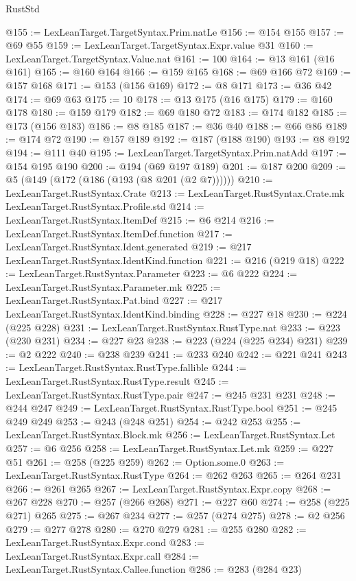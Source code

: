 \begin{lexlean}{RustStd}
\begin{coremodule}
{\begin{coremodule}
{{{{{{{{{@155 := LexLeanTarget.TargetSyntax.Prim.natLe
@156 := @154 @155
@157 := @69 @55
@159 := LexLeanTarget.TargetSyntax.Expr.value @31
@160 := LexLeanTarget.TargetSyntax.Value.nat
@161 := 100
@164 := @13 @161 (@16 @161)
@165 := @160 @164
@166 := @159 @165
@168 := @69 @166 @72
@169 := @157 @168
@171 := @153 (@156 @169)
@172 := @8 @171
@173 := @36 @42
@174 := @69 @63
@175 := 10
@178 := @13 @175 (@16 @175)
@179 := @160 @178
@180 := @159 @179
@182 := @69 @180 @72
@183 := @174 @182
@185 := @173 (@156 @183)
@186 := @8 @185
@187 := @36 @40
@188 := @66 @86
@189 := @174 @72
@190 := @157 @189
@192 := @187 (@188 @190)
@193 := @8 @192
@194 := @111 @40
@195 := LexLeanTarget.TargetSyntax.Prim.natAdd
@197 := @154 @195 @190
@200 := @194 (@69 @197 @189)
@201 := @187 @200
@209 := @5 (@149 (@172 (@186 (@193 (@8 @201 (@2 @7))))))
@210 := LexLeanTarget.RustSyntax.Crate
@213 := LexLeanTarget.RustSyntax.Crate.mk LexLeanTarget.RustSyntax.Profile.std
@214 := LexLeanTarget.RustSyntax.ItemDef
@215 := @6 @214
@216 := LexLeanTarget.RustSyntax.ItemDef.function
@217 := LexLeanTarget.RustSyntax.Ident.generated
@219 := @217 LexLeanTarget.RustSyntax.IdentKind.function
@221 := @216 (@219 @18)
@222 := LexLeanTarget.RustSyntax.Parameter
@223 := @6 @222
@224 := LexLeanTarget.RustSyntax.Parameter.mk
@225 := LexLeanTarget.RustSyntax.Pat.bind
@227 := @217 LexLeanTarget.RustSyntax.IdentKind.binding
@228 := @227 @18
@230 := @224 (@225 @228)
@231 := LexLeanTarget.RustSyntax.RustType.nat
@233 := @223 (@230 @231)
@234 := @227 @23
@238 := @223 (@224 (@225 @234) @231)
@239 := @2 @222
@240 := @238 @239
@241 := @233 @240
@242 := @221 @241
@243 := LexLeanTarget.RustSyntax.RustType.fallible
@244 := LexLeanTarget.RustSyntax.RustType.result
@245 := LexLeanTarget.RustSyntax.RustType.pair
@247 := @245 @231 @231
@248 := @244 @247
@249 := LexLeanTarget.RustSyntax.RustType.bool
@251 := @245 @249 @249
@253 := @243 (@248 @251)
@254 := @242 @253
@255 := LexLeanTarget.RustSyntax.Block.mk
@256 := LexLeanTarget.RustSyntax.Let
@257 := @6 @256
@258 := LexLeanTarget.RustSyntax.Let.mk
@259 := @227 @51
@261 := @258 (@225 @259)
@262 := Option.some.{0}
@263 := LexLeanTarget.RustSyntax.RustType
@264 := @262 @263
@265 := @264 @231
@266 := @261 @265
@267 := LexLeanTarget.RustSyntax.Expr.copy
@268 := @267 @228
@270 := @257 (@266 @268)
@271 := @227 @60
@274 := @258 (@225 @271) @265
@275 := @267 @234
@277 := @257 (@274 @275)
@278 := @2 @256
@279 := @277 @278
@280 := @270 @279
@281 := @255 @280
@282 := LexLeanTarget.RustSyntax.Expr.cond
@283 := LexLeanTarget.RustSyntax.Expr.call
@284 := LexLeanTarget.RustSyntax.Callee.function
@286 := @283 (@284 @23)
}}}}}}}}}
\end{coremodule}}
\end{coremodule}
\end{lexlean}

